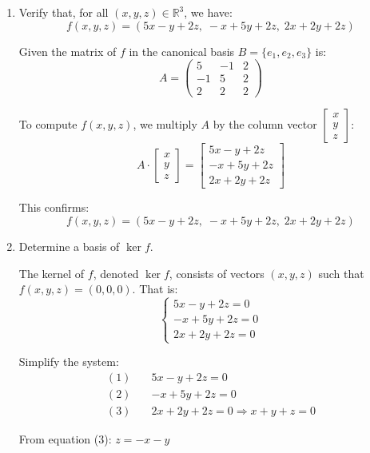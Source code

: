 \documentclass[12pt]{article}
\begin{document}
\begin{answerbox}
\begin{enumerate}
  \item Verify that, for all $(x, y, z) \in \mathbb{R}^3$, we have:
  $$
  f(x, y, z) = (5x - y + 2z,\; -x + 5y + 2z,\; 2x + 2y + 2z)
  $$

  Given the matrix of $ f $ in the canonical basis $ B = \{e_1, e_2, e_3\} $ is:
  $$
  A = 
  \begin{pmatrix}
  5 & -1 & 2 \\
  -1 & 5 & 2 \\
  2 & 2 & 2
  \end{pmatrix}
  $$

  To compute $ f(x, y, z) $, we multiply $ A $ by the column vector $ \begin{bmatrix} x \\ y \\ z \end{bmatrix} $:
  $$
  A \cdot \begin{bmatrix} x \\ y \\ z \end{bmatrix} =
  \begin{bmatrix}
  5x - y + 2z \\
  -x + 5y + 2z \\
  2x + 2y + 2z
  \end{bmatrix}
  $$

  This confirms:
  $$
  f(x, y, z) = (5x - y + 2z,\; -x + 5y + 2z,\; 2x + 2y + 2z)
  $$

  \item Determine a basis of $ \ker f $.

  The kernel of $ f $, denoted $ \ker f $, consists of vectors $ (x, y, z) $ such that $ f(x, y, z) = (0, 0, 0) $. That is:
  $$
  \begin{cases}
  5x - y + 2z = 0 \\
  -x + 5y + 2z = 0 \\
  2x + 2y + 2z = 0
  \end{cases}
  $$

  Simplify the system:
  \begin{align*}
  (1)\quad & 5x - y + 2z = 0 \\
  (2)\quad & -x + 5y + 2z = 0 \\
  (3)\quad & 2x + 2y + 2z = 0 \Rightarrow x + y + z = 0
  \end{align*}

  From equation (3): $ z = -x - y $


\end{enumerate}
\end{answerbox}
\end{document}
